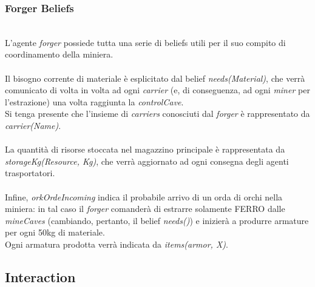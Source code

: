 \documentclass{llncs}
\begin{document}
\subsubsection{Forger Beliefs}~
\\
L'agente \textit{forger} possiede tutta una serie di beliefs utili per il suo compito di coordinamento della miniera.\\\\
Il bisogno corrente di materiale è esplicitato dal belief \textit{needs(Material)}, che verrà comunicato di volta in volta ad ogni \textit{carrier} (e, di conseguenza, ad ogni \textit{miner} per l'estrazione) una volta raggiunta la \textit{controlCave}.\\Si tenga presente che l'insieme di \textit{carriers} conosciuti dal \textit{forger} è rappresentato da \textit{carrier(Name)}.\\\\La quantità di risorse stoccata nel magazzino principale è rappresentata da \textit{storageKg(Resource, Kg)}, che verrà aggiornato ad ogni consegna degli agenti trasportatori.\\\\
Infine, \textit{orkOrdeIncoming} indica il probabile arrivo di un orda di orchi nella miniera: in tal caso il \textit{forger} comanderà di estrarre solamente FERRO dalle \textit{mineCaves} (cambiando, pertanto, il belief \textit{needs()}) e inizierà a produrre armature per ogni 50kg di materiale.\\
Ogni armatura prodotta verrà indicata da \textit{items(armor, X)}.

\subsection{Interaction}
\newpage
\end{document}
